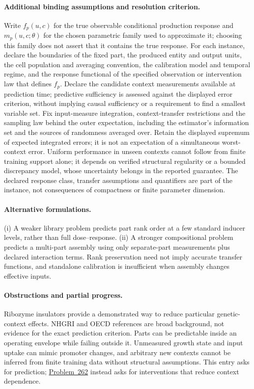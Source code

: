 \documentclass[11pt]{article}
\begin{document}
\paragraph{Additional binding assumptions and resolution criterion.} Write $f_p(u,c)$ for the true observable conditional production response and $m_p(u,c;\theta)$ for the chosen parametric family used to approximate it; choosing this family does not assert that it contains the true response. For each instance, declare the boundaries of the fixed part, the produced entity and output units, the cell population and averaging convention, the calibration model and temporal regime, and the response functional of the specified observation or intervention law that defines $f_p$. Declare the candidate context measurements available at prediction time; predictive sufficiency is assessed against the displayed error criterion, without implying causal sufficiency or a requirement to find a smallest variable set. Fix input-measure integration, context-transfer restrictions and the sampling law behind the outer expectation, including the estimator's information set and the sources of randomness averaged over. Retain the displayed supremum of expected integrated errors; it is not an expectation of a simultaneous worst-context error. Uniform performance in unseen contexts cannot follow from finite training support alone; it depends on verified structural regularity or a bounded discrepancy model, whose uncertainty belongs in the reported guarantee. The declared response class, transfer assumptions and quantifiers are part of the instance, not consequences of compactness or finite parameter dimension.

\paragraph{Alternative formulations.} (i) A weaker library problem predicts part rank order at a few standard inducer levels, rather than full dose--response. (ii) A stronger compositional problem predicts a multi-part assembly using only separate-part measurements plus declared interaction terms. Rank preservation need not imply accurate transfer functions, and standalone calibration is insufficient when assembly changes effective inputs.

\paragraph{Obstructions and partial progress.} Ribozyme insulators provide a demonstrated way to reduce particular genetic-context effects. NHGRI and OECD references are broad background, not evidence for the exact prediction criterion. Parts can be predictable inside an operating envelope while failing outside it. Unmeasured growth state and input uptake can mimic promoter changes, and arbitrary new contexts cannot be inferred from finite training data without structural assumptions. This entry asks for prediction; \href{https://we-solve.github.io/problems/context-independence-1f009fa1/}{Problem~262} instead asks for interventions that reduce context dependence.
\end{document}
